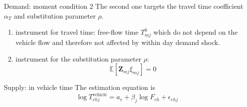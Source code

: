 \documentclass[10pt, aspectratio=169]{beamer}
\begin{document}
\begin{frame}{Demand: moment condition 2}
  The second one targets the travel time coefficient $\alpha_T$ and substitution parameter $\rho$.
  \begin{enumerate}
    \item instrument for travel time: free-flow time $T_{mj}^0$ which do not depend on
          the vehicle flow and therefore not affected by within day demand shock.
    \item instrument for the substitution parameter $\rho$: \citet{gandhi2019measuring}
          \begin{equation*}
            \mathbb{E} \left[ \mathbf{Z}_{mj} \xi_{mj} \right] = 0
          \end{equation*}
  \end{enumerate}
\end{frame}
\begin{frame}
  \begin{table}[htpb]\fontsize{6pt}{6pt}\selectfont
    \centering
    \caption{Demand estimation results}
    
  \end{table}

\end{frame}
\begin{frame}{Supply: in vehicle time}
  The estimation equation is
  \begin{equation*}
    \log T_{ehj}^{\text{vehicle}} = a_e + \beta_j \log F_{eh} + \epsilon_{ehj}
  \end{equation*}
\end{frame}
\begin{frame}
  \begin{table}[htpb]\fontsize{6pt}{6pt}\selectfont
    \centering
    \caption{Traffic congestion estimation results}
    
  \end{table}

\end{frame}
\end{document}
